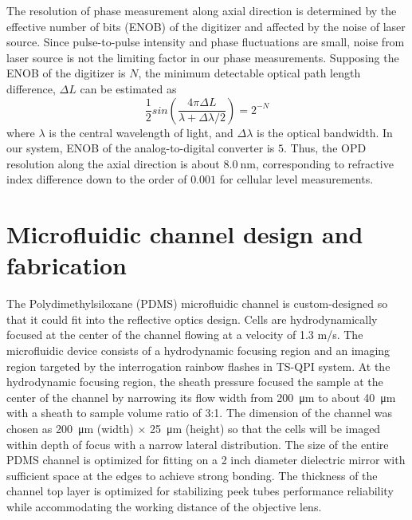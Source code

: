 \documentclass[aps,pra,reprint,longbibliography,groupedaddress]{revtex4-1}
\begin{document}
The resolution of phase measurement along axial direction is determined by the effective number of bits (ENOB) of the digitizer and affected by the noise of laser source. Since pulse-to-pulse intensity and phase fluctuations are small, noise from laser source is not the limiting factor in our phase measurements. Supposing the ENOB of the digitizer is $N$, the minimum detectable optical path length difference, $\Delta L$ can be estimated as
\begin{equation}
\frac{1}{2}sin\left(\frac{4\pi \Delta L}{\lambda + \Delta \lambda/2}\right)=2^{-N}
\end{equation}
where $\lambda$ is the central wavelength of light, and $\Delta\lambda$ is the optical bandwidth. In our system, ENOB of the analog-to-digital converter is $5$. Thus, the OPD resolution along the axial direction is about $\SI{8.0}{\nano\meter}$, corresponding to refractive index difference down to the order of $0.001$ for cellular level measurements.

\section{Microfluidic channel design and fabrication}

The Polydimethylsiloxane (PDMS) microfluidic channel is custom-designed so that it could fit into the reflective optics design. Cells are hydrodynamically focused \cite{knight1998hydrodynamic,lee2006hydrodynamic} at the center of the channel flowing at a velocity of 1.3 m/s. The microfluidic device consists of a hydrodynamic focusing region and an imaging region targeted by the interrogation rainbow flashes in TS-QPI system. At the hydrodynamic focusing region, the sheath pressure focused the sample at the center of the channel by narrowing its flow width from \SI{200}{\micro\meter} to about \SI{40}{\micro\meter} with a sheath to sample volume ratio of 3:1. The dimension of the channel was chosen as \SI{200}{\micro\meter} (width) $\times$ \SI{25}{\micro\meter} (height) so that the cells will be imaged within depth of focus with a narrow lateral distribution. The size of the entire PDMS channel is optimized for fitting on a 2 inch diameter dielectric mirror with sufficient space at the edges to achieve strong bonding. The thickness of the channel top layer is optimized for stabilizing peek tubes performance reliability while accommodating the working distance of the objective lens. 
\end{document}
